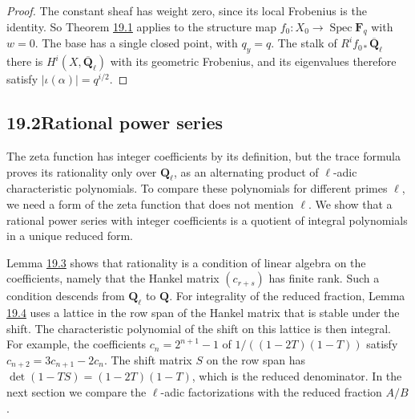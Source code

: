 \documentclass[11pt]{article}
\begin{document}
\begin{proof}[{Proof}]\label{bp9}%
The constant sheaf has weight zero, since its local Frobenius is the identity. So Theorem \hyperref[bp5]{19.1} applies to the structure map \(f_0:X_0\to\operatorname{Spec}\mathbf F_q\) with \(w=0\). The base has a single closed point, with \(q_y=q\). The stalk of \(R^if_{0*}\overline{\mathbf Q}_\ell\) there is \(H^i(X,\overline{\mathbf Q}_\ell)\) with its geometric Frobenius, and its eigenvalues therefore satisfy \(|\iota(\alpha)|=q^{i/2}\).
\end{proof}


\subsection*{\texorpdfstring{19.2\quad Rational power series}{19.2 Rational power series}}
\label{bp10}%
\label{bp11}%
The zeta function has integer coefficients by its definition, but the trace formula proves its rationality only over \(\mathbf Q_\ell\), as an alternating product of \(\ell\)-adic characteristic polynomials. To compare these polynomials for different primes \(\ell\), we need a form of the zeta function that does not mention \(\ell\). We show that a rational power series with integer coefficients is a quotient of integral polynomials in a unique reduced form.

Lemma \hyperref[bp12]{19.3} shows that rationality is a condition of linear algebra on the coefficients, namely that the Hankel matrix \((c_{r+s})\) has finite rank. Such a condition descends from \(\mathbf Q_\ell\) to \(\mathbf Q\). For integrality of the reduced fraction, Lemma \hyperref[bp15]{19.4} uses a lattice in the row span of the Hankel matrix that is stable under the shift. The characteristic polynomial of the shift on this lattice is then integral. For example, the coefficients \(c_n=2^{n+1}-1\) of \(1/((1-2T)(1-T))\) satisfy \(c_{n+2}=3c_{n+1}-2c_n\). The shift matrix \(S\) on the row span has \(\det(1-TS)=(1-2T)(1-T)\), which is the reduced denominator. In the next section we compare the \(\ell\)-adic factorizations with the reduced fraction \(A/B\).
\end{document}
